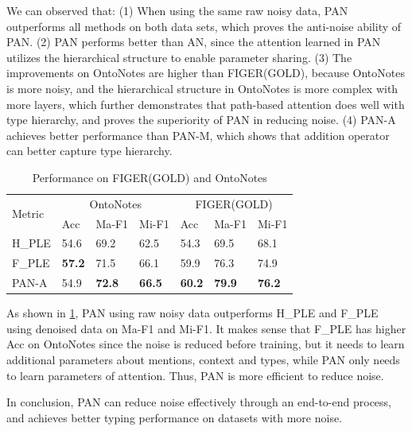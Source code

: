 \documentclass[letterpaper]{article} %
\begin{document}
We can observed that: (1) When using the same raw noisy data, PAN outperforms all methods on both data sets, %
which proves the anti-noise ability of PAN.
(2) PAN performs better than AN, since the attention learned in PAN utilizes the hierarchical structure to enable parameter sharing. %
(3) The improvements on OntoNotes are higher than FIGER(GOLD), %
because OntoNotes is more noisy, and the hierarchical structure in OntoNotes is more complex with more layers, which further demonstrates that path-based attention does well with type hierarchy, and proves the superiority of PAN in reducing noise.
(4) PAN-A achieves better performance than PAN-M, which shows that addition operator can better capture type hierarchy.


\begin{table}[htbp]
\small
\centering
\caption{Performance on FIGER(GOLD) and OntoNotes}
\label{performancedenoise}
 \begin{tabular}{p{1cm}|p{0.61cm}p{0.87cm}p{0.87cm}|p{0.60cm}p{0.87cm}p{0.87cm}}
\hline
\multirow{2}{*}{Metric} & \multicolumn{3}{c|}{OntoNotes} & \multicolumn{3}{c}{FIGER(GOLD)} \\
  & Acc &  Ma-F1 & Mi-F1 & Acc & Ma-F1 & Mi-F1 \\
\hline
H\_PLE & 54.6 & 69.2 & 62.5 & 54.3 & 69.5 & 68.1 \\
F\_PLE & \textbf{57.2} & 71.5 & 66.1& 59.9 & 76.3 & 74.9 \\
\hline
PAN-A & 54.9 & \textbf{72.8} & \textbf{66.5} & \textbf{60.2} & \textbf{79.9} & \textbf{76.2}  \\
\hline
\end{tabular}
\end{table}

As shown in \tablename  \ref{performancedenoise}, %
PAN using raw noisy data outperforms H\_PLE and F\_PLE using denoised data on Ma-F1 and Mi-F1.
It makes sense that F\_PLE has higher Acc on OntoNotes since the noise is reduced before training, but it needs to learn additional parameters about mentions, context and types, %
while PAN only needs to learn parameters of attention. Thus, PAN  is more efficient to reduce noise. %

In conclusion, PAN can reduce noise effectively through an end-to-end process, and achieves better typing performance on datasets with more noise. %



\clearpage


\end{document}
